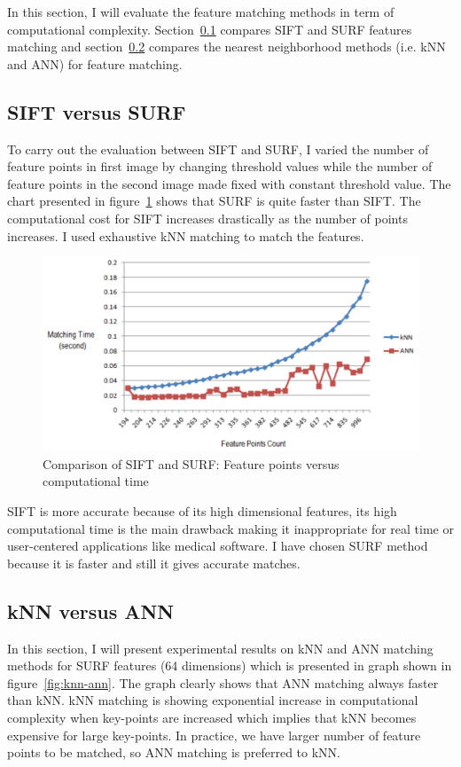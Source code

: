 In this section, I will evaluate the feature matching methods in term of computational complexity. Section~\ref{sec:SIFT-SURF} compares SIFT and SURF features matching and section~\ref{sec:kNN-ANN} compares the nearest neighborhood methods (i.e. kNN and ANN) for feature matching. 

\subsection{SIFT versus SURF}
\label{sec:SIFT-SURF}
To carry out the evaluation between SIFT and SURF, I varied the number of feature points in first image by changing threshold values while the number of feature points in the second image made fixed with constant threshold value. The chart presented in figure~\ref{fig:chart:SIFT-SURF} shows that SURF is quite faster than SIFT. The computational cost for SIFT increases drastically as the number of points increases. I used exhaustive kNN matching to match the features.
\begin{figure}[H]%
\centering
\includegraphics[width=1.2\columnwidth]{2.mainmatter/2.Methodology/figures/SIFT-SURF}%
\caption[Comparison of SIFT and SURF]{Comparison of SIFT and SURF: Feature points versus computational time}%
\label{fig:chart:SIFT-SURF}%
\end{figure}

\noindent SIFT is more accurate because of its high dimensional features, its high computational time is the main drawback making it inappropriate for real time or user-centered applications like medical software. I have chosen SURF method because it is faster and still it gives accurate matches. 

\subsection{kNN versus ANN}
\label{sec:kNN-ANN}
In this section, I will present experimental results on kNN and ANN matching methods for SURF features (64 dimensions) which is presented in graph shown in figure~\ref{fig:knn-ann}. The graph clearly shows that ANN matching always faster than kNN. kNN matching is showing exponential increase in computational complexity when key-points are increased which implies that kNN becomes expensive for large key-points. In practice, we have larger number of feature points to be matched, so ANN matching is preferred to kNN.

